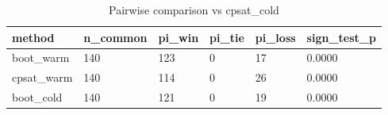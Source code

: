 \begin{table}[t]
\centering
\begin{tabular}{llllll}
\toprule
method & n\_common & pi\_win & pi\_tie & pi\_loss & sign\_test\_p \\
\midrule
boot\_warm & 140 & 123 & 0 & 17 & 0.0000 \\
cpsat\_warm & 140 & 114 & 0 & 26 & 0.0000 \\
boot\_cold & 140 & 121 & 0 & 19 & 0.0000 \\
\bottomrule
\end{tabular}
\caption{Pairwise comparison vs cpsat_cold}
\label{tab:ablation}
\end{table}
